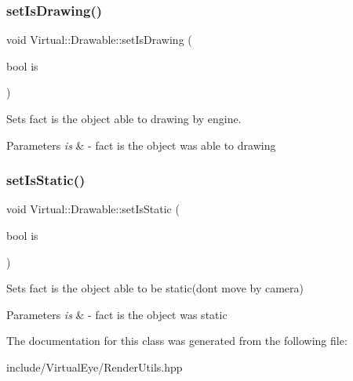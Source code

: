 \subsubsection{\texorpdfstring{set\+Is\+Drawing()}{setIsDrawing()}}
{\footnotesize\ttfamily void Virtual\+::\+Drawable\+::set\+Is\+Drawing (\begin{DoxyParamCaption}\item[{bool}]{is }\end{DoxyParamCaption})}



Sets fact is the object able to drawing by engine. 


\begin{DoxyParams}{Parameters}
{\em is} & -\/ fact is the object was able to drawing \\
\hline
\end{DoxyParams}
\hypertarget{class_virtual_1_1_drawable_a94ed4174ab71aa5aea957d821bc8d170}{}\label{class_virtual_1_1_drawable_a94ed4174ab71aa5aea957d821bc8d170} 
\subsubsection{\texorpdfstring{set\+Is\+Static()}{setIsStatic()}}
{\footnotesize\ttfamily void Virtual\+::\+Drawable\+::set\+Is\+Static (\begin{DoxyParamCaption}\item[{bool}]{is }\end{DoxyParamCaption})}



Sets fact is the object able to be static(don\textquotesingle{}t move by camera) 


\begin{DoxyParams}{Parameters}
{\em is} & -\/ fact is the object was static \\
\hline
\end{DoxyParams}


The documentation for this class was generated from the following file\+:\begin{DoxyCompactItemize}
\item 
include/\+Virtual\+Eye/Render\+Utils.\+hpp\end{DoxyCompactItemize}
